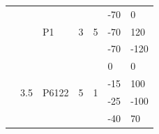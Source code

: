 \begin{table}[]
\begin{tabular}{@{}lllllll@{}}
                                &                                                                                & \multirow{3}{*}{P1}                                                       & \multirow{3}{*}{3}                                           & \multirow{3}{*}{5}                                          & -70      & 0      \\
                                &                                                                                &                                                                           &                                                              &                                                             & -70      & 120    \\
                                &                                                                                &                                                                           &                                                              &                                                             & -70      & -120   \\ \cmidrule(l){2-7} 
                                & \multirow{8}{*}{3.5}                                                           & \multirow{5}{*}{P6122}                                                    & \multirow{5}{*}{5}                                           & \multirow{5}{*}{1}                                          & 0        & 0      \\
                                &                                                                                &                                                                           &                                                              &                                                             & -15      & 100    \\
                                &                                                                                &                                                                           &                                                              &                                                             & -25      & -100   \\
                                &                                                                                &                                                                           &                                                              &                                                             & -40      & 70     \\

\end{tabular}
\end{table}
